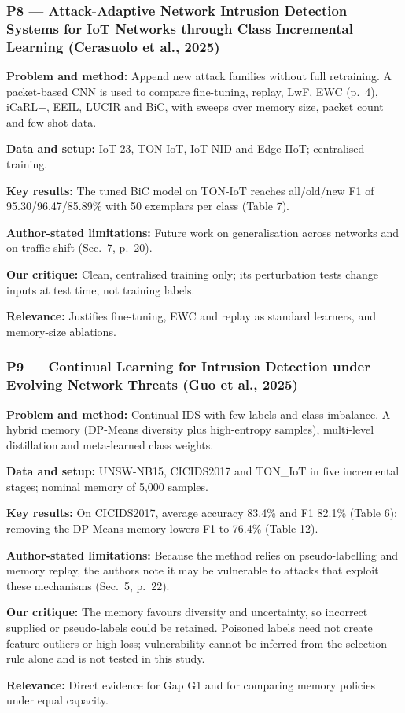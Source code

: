 \documentclass[10pt,a4paper]{article}
\newcommand{\sumitem}[2]{\noindent\textbf{#1:} #2\par}
\begin{document}
\subsubsection*{P8 --- Attack-Adaptive Network Intrusion Detection Systems for IoT Networks through Class Incremental Learning (Cerasuolo et al., 2025)}
\sumitem{Problem and method}{Append new attack families without full retraining. A packet-based CNN is used to compare fine-tuning, replay, LwF, EWC (p.~4), iCaRL+, EEIL, LUCIR and BiC, with sweeps over memory size, packet count and few-shot data.}
\sumitem{Data and setup}{IoT-23, TON-IoT, IoT-NID and Edge-IIoT; centralised training.}
\sumitem{Key results}{The tuned BiC model on TON-IoT reaches all/old/new F1 of 95.30/96.47/85.89\% with 50 exemplars per class (Table 7).}
\sumitem{Author-stated limitations}{Future work on generalisation across networks and on traffic shift (Sec.~7, p.~20).}
\sumitem{Our critique}{Clean, centralised training only; its perturbation tests change inputs at test time, not training labels.}
\sumitem{Relevance}{Justifies fine-tuning, EWC and replay as standard learners, and memory-size ablations.}

\subsubsection*{P9 --- Continual Learning for Intrusion Detection under Evolving Network Threats (Guo et al., 2025)}
\sumitem{Problem and method}{Continual IDS with few labels and class imbalance. A hybrid memory (DP-Means diversity plus high-entropy samples), multi-level distillation and meta-learned class weights.}
\sumitem{Data and setup}{UNSW-NB15, CICIDS2017 and TON\_IoT in five incremental stages; nominal memory of 5,000 samples.}
\sumitem{Key results}{On CICIDS2017, average accuracy 83.4\% and F1 82.1\% (Table 6); removing the DP-Means memory lowers F1 to 76.4\% (Table 12).}
\sumitem{Author-stated limitations}{Because the method relies on pseudo-labelling and memory replay, the authors note it may be vulnerable to attacks that exploit these mechanisms (Sec.~5, p.~22).}
\sumitem{Our critique}{The memory favours diversity and uncertainty, so incorrect supplied or pseudo-labels could be retained. Poisoned labels need not create feature outliers or high loss; vulnerability cannot be inferred from the selection rule alone and is not tested in this study.}
\sumitem{Relevance}{Direct evidence for Gap G1 and for comparing memory policies under equal capacity.}
\end{document}
